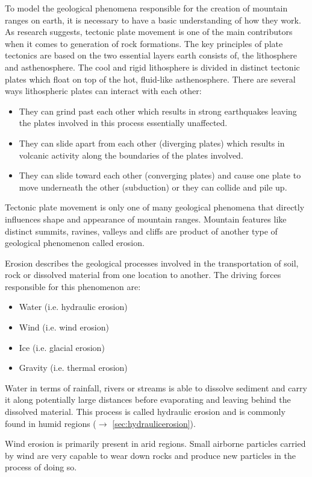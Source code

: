 \documentclass[11pt,a4paper,twoside,openright]{report}
\begin{document}
To model the geological phenomena responsible for the creation of mountain ranges on earth, it is necessary to have a basic understanding of how they work. As research suggests, tectonic plate movement is one of the main contributors when it comes to generation of rock formations. The key principles of plate tectonics are based on the two essential layers earth consists of, the lithosphere and asthenosphere. The cool and rigid lithosphere is divided in distinct tectonic plates which float on top of the hot, fluid-like asthenosphere. There are several ways lithospheric plates can interact with each other:
\begin{itemize}
  \item They can grind past each other which results in strong earthquakes leaving the plates involved in this process essentially unaffected.
  \item They can slide apart from each other (diverging plates) which results in volcanic activity along the  boundaries of the plates involved.
  \item They can slide toward each other (converging plates) and cause one plate to move underneath the other (subduction) or they can collide and pile up.
\end{itemize}
Tectonic plate movement is only one of many geological phenomena that directly influences shape and appearance of mountain ranges. Mountain features like distinct summits, ravines, valleys and cliffs are product of another type of geological phenomenon called erosion.

Erosion describes the geological processes involved in the transportation of soil, rock or dissolved material from one location to another. The driving forces responsible for this phenomenon are:
\begin{itemize}
  \item Water (i.e. hydraulic erosion)
  \item Wind (i.e. wind erosion)
  \item Ice (i.e. glacial erosion)
  \item Gravity (i.e. thermal erosion)
\end{itemize}

Water in terms of rainfall, rivers or streams is able to dissolve sediment and carry it along potentially large distances before evaporating and leaving behind the dissolved material. This process is called hydraulic erosion and is commonly found in humid regions ($\rightarrow$ \cref{sec:hydraulicerosion}).

Wind erosion is primarily present in arid regions. Small airborne particles carried by wind are very capable to wear down rocks and produce new particles in the process of doing so.
\end{document}
